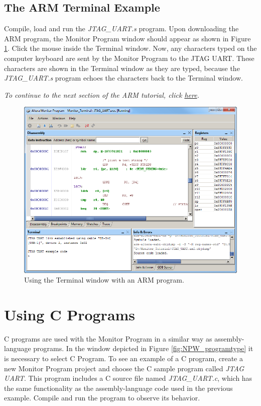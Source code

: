 \documentclass[11pt, twoside, pdftex]{article}
\begin{document}
\subsection{The ARM Terminal Example}
\label{tut:arm_5}

Compile, load and run the {\it JTAG\_UART.s} program.
Upon downloading the ARM program, the Monitor Program
window should appear as shown in Figure \ref{fig:AMP_terminal_arm}. 
Click the mouse inside the Terminal window. Now, any characters
typed on the computer keyboard are sent by the Monitor Program to
the JTAG UART. These characters are shown in the Terminal window
as they are typed, because the {\it JTAG\_UART.s} program echoes
the characters back to the Terminal window.

{\it To continue to the next section of the ARM tutorial, click \hyperref[tut:arm_6]{here}.}

\begin{figure}[H]
   \begin{center}
      \includegraphics[scale=0.6]{screenshots/figure46.png}
   \end{center}
   \caption{Using the Terminal window with an ARM program.}
   \label{fig:AMP_terminal_arm}
\end{figure}

\newpage
\section{Using C Programs}

C programs are used with the Monitor Program in a similar way as
assembly-language programs. In the window depicted in Figure \ref{fig:NPW_programtype}
it is necessary to select {\sf C Program}.
To see an example of a C program,
create a new Monitor Program project and choose
the C sample program called {\it JTAG UART}.  
This program includes a C source file named {\it JTAG\_UART.c},
which has the same functionality as the assembly-language code
used in the previous example. 
Compile and run the program to observe its behavior.
\end{document}

